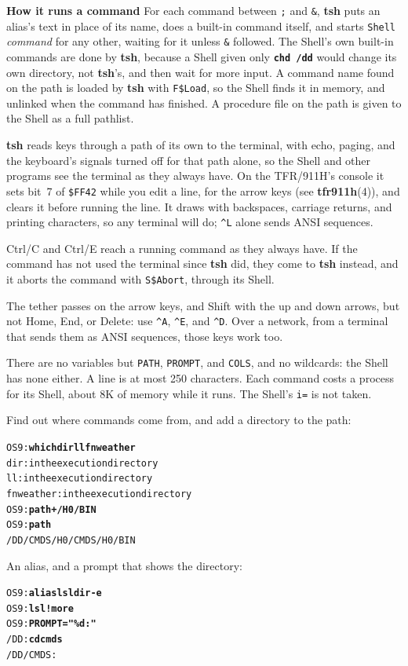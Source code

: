 \documentclass[10pt,twoside,openany]{book}
\newcommand{\cmd}[1]{\textbf{#1}}            %
\newcommand{\var}[1]{\textit{#1}}            %
\newcommand{\file}[1]{\texttt{#1}}           %
\newcommand{\key}[1]{\textsf{\small #1}}     %
\newcommand{\rp}[2]{\textbf{#1}(#2)}         %
\newcommand{\type}[1]{\texttt{\textbf{#1}}}  %
\newcommand{\sans}[1]{\textsf{#1}}
\newenvironment{ex}{\par\vspace{0.3ex}\small\begin{alltt}}{\end{alltt}\vspace{0.3ex}}
\newenvironment{refpage}{%
  \begin{list}{}{%
    \setlength{\leftmargin}{1.3in}\setlength{\labelwidth}{1.2in}%
    \setlength{\labelsep}{0.1in}\setlength{\itemsep}{1.6ex}%
    \setlength{\parsep}{0.7ex}\setlength{\topsep}{0pt}\setlength{\listparindent}{0pt}%
    \renewcommand{\makelabel}[1]{\sffamily\bfseries ##1\hfil}}}%
  {\end{list}}
\newcommand{\rh}[1]{\item[#1]}
\begin{document}
\begin{refpage}
\sans{\textbf{How it runs a command}} For each command between
\texttt{;} and \texttt{\&}, \cmd{tsh} puts an alias's text in place of
its name, does a built-in command itself, and starts \texttt{Shell}
\var{command} for any other, waiting for it unless \texttt{\&} followed.
The Shell's own built-in commands are done by \cmd{tsh}, because a Shell
given only \type{chd /dd} would change its own directory, not
\cmd{tsh}'s, and then wait for more input. A command name found on the
path is loaded by \cmd{tsh} with \texttt{F\$Load}, so the Shell finds it
in memory, and unlinked when the command has finished. A procedure file
on the path is given to the Shell as a full pathlist.

\cmd{tsh} reads keys through a path of its own to the terminal, with echo,
paging, and the keyboard's signals turned off for that path alone, so the
Shell and other programs see the terminal as they always have. On the
TFR/911H's console it sets bit~7 of \file{\$FF42} while you edit a line,
for the arrow keys (see \rp{tfr911h}{4}), and clears it before running the
line. It draws with backspaces, carriage returns, and printing
characters, so any terminal will do; \texttt{\^{}L} alone sends ANSI
sequences.

\key{Ctrl/C} and \key{Ctrl/E} reach a running command as they always
have. If the command has not used the terminal since \cmd{tsh} did, they
come to \cmd{tsh} instead, and it aborts the command with \texttt{S\$Abort},
through its Shell.
\rh{Restrictions}
The tether passes on the arrow keys, and Shift with the up and down
arrows, but not \key{Home}, \key{End}, or \key{Delete}: use
\texttt{\^{}A}, \texttt{\^{}E}, and \texttt{\^{}D}. Over a network, from a
terminal that sends them as ANSI sequences, those keys work too.

There are no variables but \texttt{PATH}, \texttt{PROMPT}, and
\texttt{COLS}, and no wildcards: the Shell has none either. A line is at
most 250 characters. Each command costs a process for its Shell, about
8K of memory while it runs. The Shell's \texttt{i=} is not taken.
\rh{Examples}
Find out where commands come from, and add a directory to the path:
\begin{ex}
OS9:\textbf{which dir ll fnweather}
dir: in the execution directory
ll: in the execution directory
fnweather: in the execution directory
OS9:\textbf{path +/H0/BIN}
OS9:\textbf{path}
/DD/CMDS /H0/CMDS /H0/BIN
\end{ex}
An alias, and a prompt that shows the directory:
\begin{ex}
OS9:\textbf{alias lsl dir -e}
OS9:\textbf{lsl ! more}
OS9:\textbf{PROMPT="\%d: "}
/DD: \textbf{cd cmds}
/DD/CMDS:
\end{ex}


\end{refpage}
\end{document}
